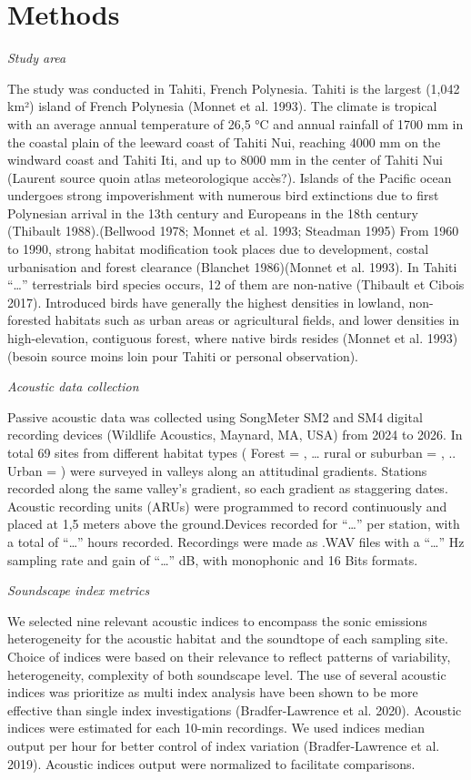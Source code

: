 \documentclass[
  french,
  11pt,
]{stylisharticle}
\begin{document}
\section{Methods}\label{methods}

\emph{Study area}

The study was conducted in Tahiti, French Polynesia. Tahiti is the
largest (1,042 km²) island of French Polynesia (Monnet et al. 1993). The
climate is tropical with an average annual temperature of 26,5 °C and
annual rainfall of 1700 mm in the coastal plain of the leeward coast of
Tahiti Nui, reaching 4000 mm on the windward coast and Tahiti Iti, and
up to 8000 mm in the center of Tahiti Nui (Laurent source quoin atlas
meteorologique accès?). Islands of the Pacific ocean undergoes strong
impoverishment with numerous bird extinctions due to first Polynesian
arrival in the 13th century and Europeans in the 18th century (Thibault
1988).(Bellwood 1978; Monnet et al. 1993; Steadman 1995) From 1960 to
1990, strong habitat modification took places due to development, costal
urbanisation and forest clearance (Blanchet 1986)(Monnet et al. 1993).
In Tahiti \enquote{\ldots{}} terrestrials bird species occurs, 12 of
them are non-native (Thibault et Cibois 2017). Introduced birds have
generally the highest densities in lowland, non-forested habitats such
as urban areas or agricultural fields, and lower densities in
high-elevation, contiguous forest, where native birds resides (Monnet et
al. 1993) (besoin source moins loin pour Tahiti or personal
observation).

\emph{Acoustic data collection}

Passive acoustic data was collected using SongMeter SM2 and SM4 digital
recording devices (Wildlife Acoustics, Maynard, MA, USA) from 2024 to
2026. In total 69 sites from different habitat types ( Forest = ,
\ldots{} rural or suburban = , .. Urban = ) were surveyed in valleys
along an attitudinal gradients. Stations recorded along the same
valley's gradient, so each gradient as staggering dates. Acoustic
recording units (ARUs) were programmed to record continuously and placed
at 1,5 meters above the ground.Devices recorded for \enquote{\ldots{}}
per station, with a total of \enquote{\ldots{}} hours recorded.
Recordings were made as .WAV files with a \enquote{\ldots{}} Hz sampling
rate and gain of \enquote{\ldots{}} dB, with monophonic and 16 Bits
formats.

\emph{Soundscape index metrics}

We selected nine relevant acoustic indices to encompass the sonic
emissions heterogeneity for the acoustic habitat and the soundtope of
each sampling site. Choice of indices were based on their relevance to
reflect patterns of variability, heterogeneity, complexity of both
soundscape level. The use of several acoustic indices was prioritize as
multi index analysis have been shown to be more effective than single
index investigations (Bradfer-Lawrence et al. 2020). Acoustic indices
were estimated for each 10-min recordings. We used indices median output
per hour for better control of index variation (Bradfer-Lawrence et al.
2019). Acoustic indices output were normalized to facilitate
comparisons.
\end{document}
